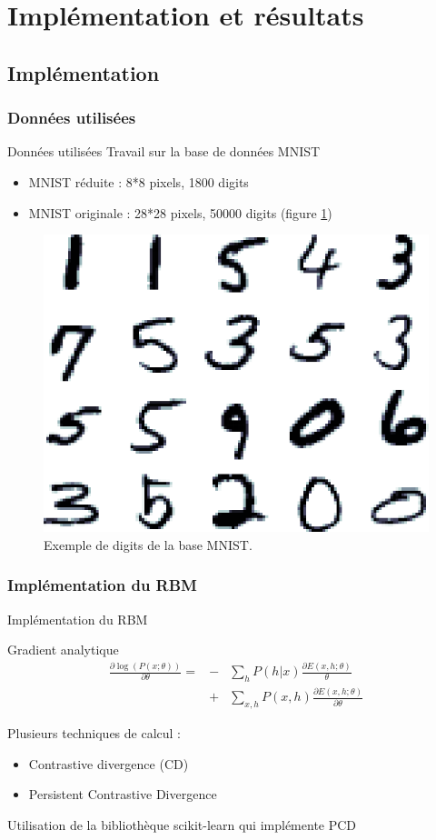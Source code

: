 \section{Implémentation et résultats}

\subsection{Implémentation}

\subsubsection{Données utilisées}

\begin{frame}{Données utilisées}
	Travail sur la base de données MNIST
	\begin{itemize}
		\item MNIST réduite : 8*8 pixels, 1800 digits
		\item MNIST originale : 28*28 pixels, 50000 digits (figure \ref{MNISTORI})
	\end{itemize}
	\begin{figure}[ht!]
	\centering
	\includegraphics[width = .4\columnwidth]{../fig/mnist_originals.png}
	\caption{Exemple de digits de la base MNIST.}
	\label{MNISTORI}
	\end{figure}
\end{frame}

\subsubsection{Implémentation du RBM}

\begin{frame}{Implémentation du RBM}
	\begin{block}{Gradient analytique}
		\begin{eqnarray}
			\displaystyle \frac{\partial \log \left ( P(x; \theta) \right )}{\partial \theta} =  & - & \displaystyle \sum_{h} P(h|x) \frac{\partial E(x, h; \theta)}{\theta}  \\
			&+& \displaystyle \sum_{x, h} P(x, h) \frac{\partial E(x, h; \theta)}{\partial\theta} 
		\end{eqnarray}
	\end{block}
	Plusieurs techniques de calcul :
	\begin{itemize}
		\item Contrastive divergence (CD)
		\item Persistent Contrastive Divergence
	\end{itemize}
	Utilisation de la bibliothèque scikit-learn qui implémente PCD
\end{frame}

